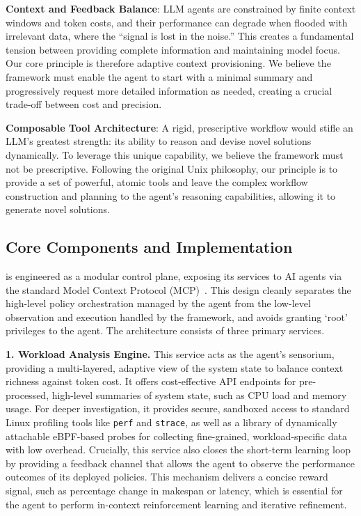 \textbf{Context and Feedback Balance}: LLM agents are constrained by finite context windows and token costs, and their performance can degrade when flooded with irrelevant data, where the ``signal is lost in the noise.'' This creates a fundamental tension between providing complete information and maintaining model focus. Our core principle is therefore adaptive context provisioning. We believe the framework must enable the agent to start with a minimal summary and progressively request more detailed information as needed, creating a crucial trade-off between cost and precision.

\textbf{Composable Tool Architecture}: A rigid, prescriptive workflow would stifle an LLM's greatest strength: its ability to reason and devise novel solutions dynamically. To leverage this unique capability, we believe the framework must not be prescriptive. Following the original Unix philosophy, our principle is to provide a set of powerful, atomic tools and leave the complex workflow construction and planning to the agent's reasoning capabilities, allowing it to generate novel solutions.

\subsection{Core Components and Implementation}
\sys is engineered as a modular control plane, exposing its services to AI agents via the standard Model Context Protocol (MCP)~\cite{anthropic2024mcp}. This design cleanly separates the high-level policy orchestration managed by the agent from the low-level observation and execution handled by the framework, and avoids granting `root' privileges to the agent. The architecture consists of three primary services.

\textbf{1. Workload Analysis Engine.} This service acts as the agent's sensorium, providing a multi-layered, adaptive view of the system state to balance context richness against token cost. It offers cost-effective API endpoints for pre-processed, high-level summaries of system state, such as CPU load and memory usage. For deeper investigation, it provides secure, sandboxed access to standard Linux profiling tools like \texttt{perf} and \texttt{strace}, as well as a library of dynamically attachable eBPF-based probes for collecting fine-grained, workload-specific data with low overhead. Crucially, this service also closes the short-term learning loop by providing a feedback channel that allows the agent to observe the performance outcomes of its deployed policies. This mechanism delivers a concise reward signal, such as percentage change in makespan or latency, which is essential for the agent to perform in-context reinforcement learning and iterative refinement.

